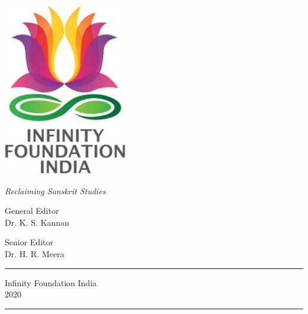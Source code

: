 \thispagestyle{empty}
\begin{center}
\includegraphics[scale=0.3]{images/logo.png}
\bigskip

{\fontsize{10}{14}\selectfont\sl
Reclaiming Sanskrit Studies
}

\bigskip
\end{center}
\medskip

\begin{center}
{\fontsize{20}{24}\selectfont {Karnāṭaka Śāstrīya Saṅgīta}}

\vfill


{\fontsize{14}{18}\selectfont 
General Editor\\[2pt]
Dr. K. S. Kannan}\par

\bigskip
 
{\fontsize{14}{18}\selectfont 
Senior Editor\\[2pt]
Dr. H. R. Meera}\par
\vfill

\rule{5cm}{1pt}

{\fontsize{12}{14}\selectfont
Infinity Foundation India\\[4pt]
2020}

\rule{5cm}{1pt}
\end{center}




